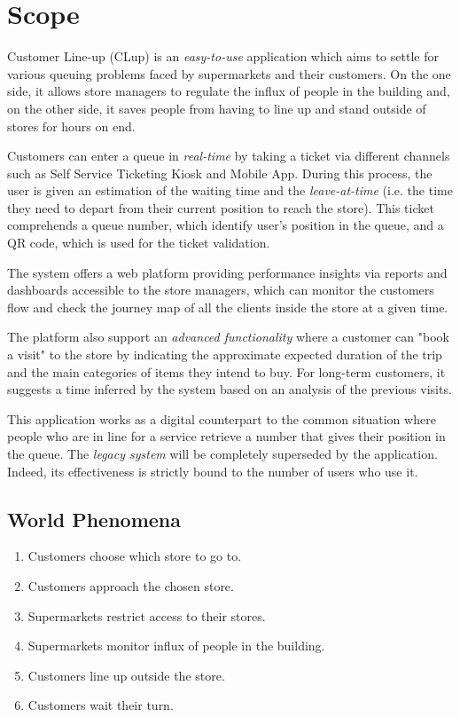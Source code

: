 \section{Scope}
Customer Line-up (CLup) is an \textit{easy-to-use} application which aims to settle for various queuing problems faced by supermarkets and their customers.\newline
On the one side, it allows store managers to regulate the influx of people in the building and, on the other side, it saves people from having to line up and stand outside of stores for hours on end.

Customers can enter a queue in \textit{real-time} by taking a ticket via different channels such as Self Service Ticketing Kiosk and Mobile App. During this process, the user is given an estimation of the waiting time and the \textit{leave-at-time} (i.e. the time they need to depart from their current position to reach the store). This ticket comprehends a queue number, which identify user's position in the queue, and a QR code, which is used for the ticket validation.

The system offers a web platform providing performance insights via reports and dashboards accessible to the store managers, which can monitor the customers flow and check the journey map of all the clients inside the store at a given time.

The platform also support an \textit{advanced functionality} where a customer can "book a visit" to the store by indicating the approximate expected duration of the trip and the main categories of items they intend to buy. For long-term customers, it suggests a time inferred by the system based on an analysis of the previous visits.

This application works as a digital counterpart to the common situation where people who are in line for a service retrieve a number that gives their position in the queue. The \textit{legacy system} will be completely superseded by the application. Indeed, its effectiveness is strictly bound to the number of users who use it.

\subsection{World Phenomena}
\begin{enumerate}[label=\textbf{WP.\arabic*}, leftmargin=+.425in]
	\item Customers choose which store to go to.
	\item Customers approach the chosen store.
	\item Supermarkets restrict access to their stores.
	\item Supermarkets monitor influx of people in the building.
	\item Customers line up outside the store.
	\item Customers wait their turn.
\end{enumerate}

